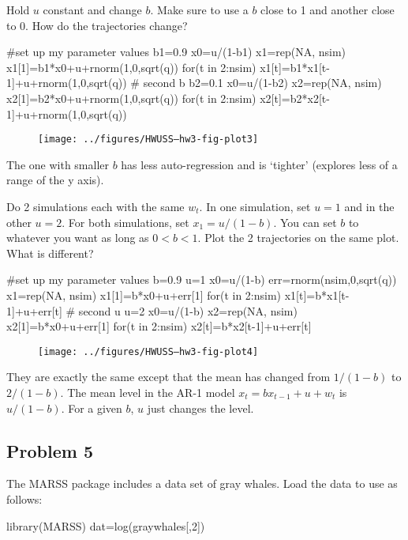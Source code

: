 \begin{wideenumerate}
\item Hold $u$ constant and change $b$.  Make sure to use a $b$ close to 1 and another close to 0. How do the trajectories change?
\begin{Schunk}
\begin{Sinput}
 #set up my parameter values
 b1=0.9
 x0=u/(1-b1)
 x1=rep(NA, nsim)
 x1[1]=b1*x0+u+rnorm(1,0,sqrt(q))
 for(t in 2:nsim) x1[t]=b1*x1[t-1]+u+rnorm(1,0,sqrt(q))
 # second b
 b2=0.1
 x0=u/(1-b2)
 x2=rep(NA, nsim)
 x2[1]=b2*x0+u+rnorm(1,0,sqrt(q))
 for(t in 2:nsim) x2[t]=b2*x2[t-1]+u+rnorm(1,0,sqrt(q))
\end{Sinput}
\end{Schunk}
\begin{figure}[htp]
\begin{center}
\texttt{[image: ../figures/HWUSS--hw3-fig-plot3]}
\end{center}
\end{figure}
The one with smaller $b$ has less auto-regression and is `tighter' (explores less of a range of the y axis).

\item Do 2 simulations each with the same $w_t$.  In one simulation, set $u=1$ and in the other $u=2$.  For both simulations, set $x_1 = u/(1-b)$.  You can set $b$ to whatever you want as long as $0<b<1$.  Plot the 2 trajectories on the same plot.  What is different?

\begin{Schunk}
\begin{Sinput}
 #set up my parameter values
 b=0.9
 u=1
 x0=u/(1-b)
 err=rnorm(nsim,0,sqrt(q))
 x1=rep(NA, nsim)
 x1[1]=b*x0+u+err[1]
 for(t in 2:nsim) x1[t]=b*x1[t-1]+u+err[t]
 # second u
 u=2
 x0=u/(1-b)
 x2=rep(NA, nsim)
 x2[1]=b*x0+u+err[1]
 for(t in 2:nsim) x2[t]=b*x2[t-1]+u+err[t]
\end{Sinput}
\end{Schunk}
\begin{figure}[htp]
\begin{center}
\texttt{[image: ../figures/HWUSS--hw3-fig-plot4]}
\end{center}
\end{figure}
They are exactly the same except that the mean has changed from $1/(1-b)$ to $2/(1-b)$.  The mean level in the AR-1 model $x_t = b x_{t-1} + u + w_t$ is $u/(1-b)$.  For a given $b$, $u$ just changes the level.
\end{wideenumerate}


\subsection*{Problem 5}
The MARSS package includes a data set of gray whales.  Load the data to use as follows:
\begin{Schunk}
\begin{Sinput}
 library(MARSS)
 dat=log(graywhales[,2])
\end{Sinput}
\end{Schunk}

